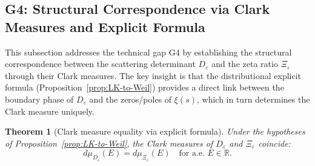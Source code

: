 ﻿\documentclass[12pt,a4paper]{article}
\newtheorem{theorem}{Theorem}[section]
\theoremstyle{definition}
\theoremstyle{remark}
\newcommand{\RR}{\mathbb{R}}
\begin{document}
\subsection{G4: Structural Correspondence via Clark Measures and Explicit Formula}
\label{subsec:G4-structural-correspondence}

This subsection addresses the technical gap G4 by establishing the structural correspondence between the scattering determinant $D_\varepsilon$ and the zeta ratio $\Xi_\varepsilon$ through their Clark measures. The key insight is that the distributional explicit formula (Proposition~\ref{prop:LK-to-Weil}) provides a direct link between the boundary phase of $D_\varepsilon$ and the zeros/poles of $\xi(s)$, which in turn determines the Clark measure uniquely.

\begin{theorem}[Clark measure equality via explicit formula]
\label{thm:clark-measure-equality}
Under the hypotheses of Proposition~\ref{prop:LK-to-Weil}, the Clark measures of $D_\varepsilon$ and $\Xi_\varepsilon$ coincide:
\[
  d\mu_{D_\varepsilon}(E) = d\mu_{\Xi_\varepsilon}(E) \quad \text{for a.e. } E \in \RR.
\]
\end{theorem}
\end{document}
